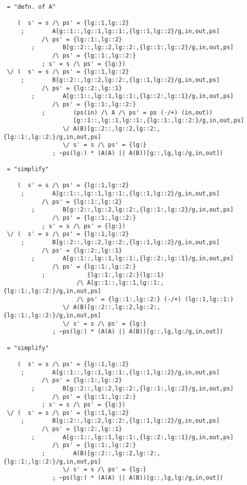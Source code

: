 \begin{verbatim}
 = "defn. of A"

    (  s' = s /\ ps' = {lg::1,lg::2}
     ;        A[g::1::,lg::1,lg::1:,{lg::1,lg::2}/g,in,out,ps]
           /\ ps' = {lg::1:,lg::2}
        ;        B[g::2::,lg::2,lg::2:,{lg::1:,lg::2}/g,in,out,ps]
              /\ ps' = {lg::1:,lg::2:}
           ; s' = s /\ ps' = {lg:})
 \/ (  s' = s /\ ps' = {lg::1,lg::2}
     ;        B[g::2::,lg::2,lg::2:,{lg::1,lg::2}/g,in,out,ps]
           /\ ps' = {lg::2:,lg::1}
        ;        A[g::1::,lg::1,lg::1:,{lg::2:,lg::1}/g,in,out,ps]
              /\ ps' = {lg::1:,lg::2:}
           ;        (ps(in) /\ A /\ ps' = ps (-/+) (in,out))
                    [g::1::,lg::1,lg::1:,{lg::1:,lg::2:}/g,in,out,ps]
                 \/ A(B)[g::2::,lg::2,lg::2:,{lg::1:,lg::2:}/g,in,out,ps]
                 \/ s' = s /\ ps' = {lg:}
              ; ~ps(lg:) * (A(A) || A(B))[g::,lg,lg:/g,in,out])

 = "simplify"

    (  s' = s /\ ps' = {lg::1,lg::2}
     ;        A[g::1::,lg::1,lg::1:,{lg::1,lg::2}/g,in,out,ps]
           /\ ps' = {lg::1:,lg::2}
        ;        B[g::2::,lg::2,lg::2:,{lg::1:,lg::2}/g,in,out,ps]
              /\ ps' = {lg::1:,lg::2:}
           ; s' = s /\ ps' = {lg:})
 \/ (  s' = s /\ ps' = {lg::1,lg::2}
     ;        B[g::2::,lg::2,lg::2:,{lg::1,lg::2}/g,in,out,ps]
           /\ ps' = {lg::2:,lg::1}
        ;        A[g::1::,lg::1,lg::1:,{lg::2:,lg::1}/g,in,out,ps]
              /\ ps' = {lg::1:,lg::2:}
           ;            {lg::1:,lg::2:}(lg::1)
                     /\ A[g::1::,lg::1,lg::1:,{lg::1:,lg::2:}/g,in,out,ps]
                     /\ ps' = {lg::1:,lg::2:} (-/+) (lg::1,lg::1:)
                 \/ A(B)[g::2::,lg::2,lg::2:,{lg::1:,lg::2:}/g,in,out,ps]
                 \/ s' = s /\ ps' = {lg:}
              ; ~ps(lg:) * (A(A) || A(B))[g::,lg,lg:/g,in,out])

 = "simplify"

    (  s' = s /\ ps' = {lg::1,lg::2}
     ;        A[g::1::,lg::1,lg::1:,{lg::1,lg::2}/g,in,out,ps]
           /\ ps' = {lg::1:,lg::2}
        ;        B[g::2::,lg::2,lg::2:,{lg::1:,lg::2}/g,in,out,ps]
              /\ ps' = {lg::1:,lg::2:}
           ; s' = s /\ ps' = {lg:})
 \/ (  s' = s /\ ps' = {lg::1,lg::2}
     ;        B[g::2::,lg::2,lg::2:,{lg::1,lg::2}/g,in,out,ps]
           /\ ps' = {lg::2:,lg::1}
        ;        A[g::1::,lg::1,lg::1:,{lg::2:,lg::1}/g,in,out,ps]
              /\ ps' = {lg::1:,lg::2:}
           ;        A(B)[g::2::,lg::2,lg::2:,{lg::1:,lg::2:}/g,in,out,ps]
                 \/ s' = s /\ ps' = {lg:}
              ; ~ps(lg:) * (A(A) || A(B))[g::,lg,lg:/g,in,out])


\end{verbatim}
